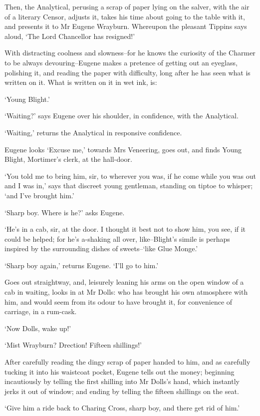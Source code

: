 Then, the Analytical, perusing a scrap of paper lying on the salver,
with the air of a literary Censor, adjusts it, takes his time about
going to the table with it, and presents it to Mr Eugene Wrayburn.
Whereupon the pleasant Tippins says aloud, ‘The Lord Chancellor has
resigned!’

With distracting coolness and slowness--for he knows the curiosity of
the Charmer to be always devouring--Eugene makes a pretence of getting
out an eyeglass, polishing it, and reading the paper with difficulty,
long after he has seen what is written on it. What is written on it in
wet ink, is:

‘Young Blight.’

‘Waiting?’ says Eugene over his shoulder, in confidence, with the
Analytical.

‘Waiting,’ returns the Analytical in responsive confidence.

Eugene looks ‘Excuse me,’ towards Mrs Veneering, goes out, and finds
Young Blight, Mortimer’s clerk, at the hall-door.

‘You told me to bring him, sir, to wherever you was, if he come while
you was out and I was in,’ says that discreet young gentleman, standing
on tiptoe to whisper; ‘and I’ve brought him.’

‘Sharp boy. Where is he?’ asks Eugene.

‘He’s in a cab, sir, at the door. I thought it best not to show him, you
see, if it could be helped; for he’s a-shaking all over, like--Blight’s
simile is perhaps inspired by the surrounding dishes of sweets--‘like
Glue Monge.’

‘Sharp boy again,’ returns Eugene. ‘I’ll go to him.’

Goes out straightway, and, leisurely leaning his arms on the open window
of a cab in waiting, looks in at Mr Dolls: who has brought his own
atmosphere with him, and would seem from its odour to have brought it,
for convenience of carriage, in a rum-cask.

‘Now Dolls, wake up!’

‘Mist Wrayburn? Drection! Fifteen shillings!’

After carefully reading the dingy scrap of paper handed to him, and as
carefully tucking it into his waistcoat pocket, Eugene tells out the
money; beginning incautiously by telling the first shilling into Mr
Dolls’s hand, which instantly jerks it out of window; and ending by
telling the fifteen shillings on the seat.

‘Give him a ride back to Charing Cross, sharp boy, and there get rid of
him.’

